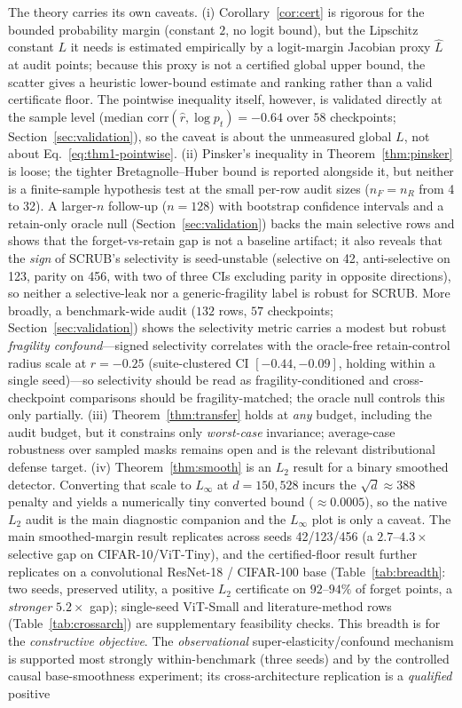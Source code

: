 \documentclass[11pt]{article}
\begin{document}
The theory carries its own caveats. (i) Corollary~\ref{cor:cert} is rigorous for the bounded probability margin (constant $2$, no logit bound), but the Lipschitz constant $L$ it needs is estimated empirically by a logit-margin Jacobian proxy $\hat L$ at audit points; because this proxy is not a certified global upper bound, the scatter gives a heuristic lower-bound estimate and ranking rather than a valid certificate floor. The pointwise inequality itself, however, is validated directly at the sample level (median $\mathrm{corr}(\hat r,\log p_t)=-0.64$ over $58$ checkpoints; Section~\ref{sec:validation}), so the caveat is about the unmeasured global $L$, not about Eq.~\eqref{eq:thm1-pointwise}. (ii) Pinsker's inequality in Theorem~\ref{thm:pinsker} is loose; the tighter Bretagnolle--Huber bound is reported alongside it, but neither is a finite-sample hypothesis test at the small per-row audit sizes ($n_F = n_R$ from 4 to 32). A larger-$n$ follow-up ($n = 128$) with bootstrap confidence intervals and a retain-only oracle null (Section~\ref{sec:validation}) backs the main selective rows and shows that the forget-vs-retain gap is not a baseline artifact; it also reveals that the \emph{sign} of SCRUB's selectivity is seed-unstable (selective on 42, anti-selective on 123, parity on 456, with two of three CIs excluding parity in opposite directions), so neither a selective-leak nor a generic-fragility label is robust for SCRUB. More broadly, a benchmark-wide audit ($132$ rows, $57$ checkpoints; Section~\ref{sec:validation}) shows the selectivity metric carries a modest but robust \emph{fragility confound}---signed selectivity correlates with the oracle-free retain-control radius scale at $r=-0.25$ (suite-clustered CI $[-0.44,-0.09]$, holding within a single seed)---so selectivity should be read as fragility-conditioned and cross-checkpoint comparisons should be fragility-matched; the oracle null controls this only partially. (iii) Theorem~\ref{thm:transfer} holds at \emph{any} budget, including the audit budget, but it constrains only \emph{worst-case} invariance; average-case robustness over sampled masks remains open and is the relevant distributional defense target. (iv) Theorem~\ref{thm:smooth} is an $L_2$ result for a binary smoothed detector. Converting that scale to $L_\infty$ at $d = 150{,}528$ incurs the $\sqrt{d}\approx388$ penalty and yields a numerically tiny converted bound ($\approx 0.0005$), so the native $L_2$ audit is the main diagnostic companion and the $L_\infty$ plot is only a caveat. The main smoothed-margin result replicates across seeds 42/123/456 (a $2.7$--$4.3\times$ selective gap on CIFAR-10/ViT-Tiny), and the certified-floor result further replicates on a convolutional ResNet-18 / CIFAR-100 base (Table~\ref{tab:breadth}: two seeds, preserved utility, a positive $L_2$ certificate on $92$--$94\%$ of forget points, a \emph{stronger} $5.2\times$ gap); single-seed ViT-Small and literature-method rows (Table~\ref{tab:crossarch}) are supplementary feasibility checks. This breadth is for the \emph{constructive objective}. The \emph{observational} super-elasticity/confound mechanism is supported most strongly within-benchmark (three seeds) and by the controlled causal base-smoothness experiment; its cross-architecture replication is a \emph{qualified} positive 
\end{document}
